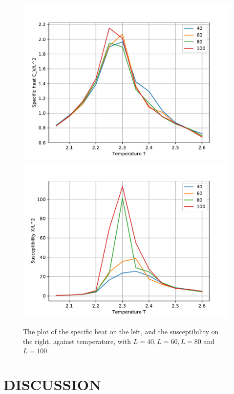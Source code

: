 \documentclass[a4paper]{article}
\let\Oldsection\section
\renewcommand{\section}{\FloatBarrier\Oldsection}
\begin{document}
\begin{figure}[!htb]
	\centering 
	\includegraphics[scale=0.56]{../opp_e_cv0.pdf}
	\includegraphics[scale=0.56]{../opp_e_xi0.pdf}
	\caption{The plot of the specific heat on the left, and the susceptibility on the right, against temperature, with $L = 40, L = 60, L = 80$ and $L = 100$}
	\label{e0}
\end{figure}

\section{DISCUSSION}
\end{document}
